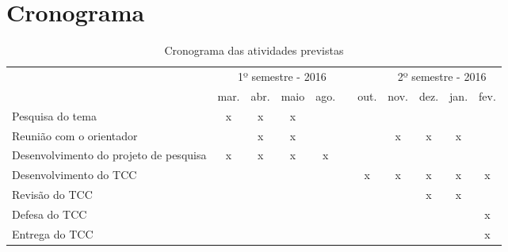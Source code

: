 \section{Cronograma}\label{lcronograma}

\begin{table}[H]
\IBGEtab
{%
	\caption{Cronograma das atividades previstas}\label{tcronograma}
}{%
	\begin{tabular}{lcccccccccc}
	\toprule
	& \multicolumn{5}{c}{1º semestre - 2016} && \multicolumn{4}{c}{2º semestre - 2016} \\
	\cline{2-5}
	\cline{7-11}
	\raisebox{1.5ex}{Etapa}  & mar. & abr. & maio & ago. && out. & nov. & dez. & jan. & fev. \\ 
	\midrule \midrule
				  Pesquisa do tema &x&x&x&&&&&&& \\ \hline
				  Reunião com o orientador &&x&x&&&&x&x&x& \\ \hline
				  Desenvolvimento do projeto de pesquisa &x&x&x&x&&&&&& \\ \hline
				  Desenvolvimento do TCC &&&&&&x&x&x&x&x \\ \hline
				  Revisão do TCC &&&&&&&&x&x& \\ \hline
				  Defesa do TCC &&&&&&&&&&x\\ \hline
				  Entrega do TCC &&&&&&&&&&x\\
	\bottomrule
	\end{tabular}%
}{%
%
}
\end{table}
